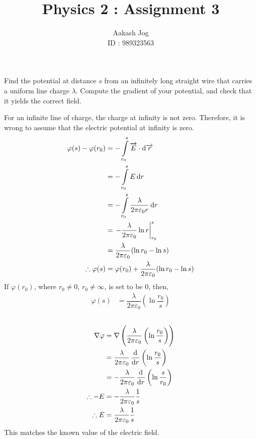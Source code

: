 \documentclass[fleqn, a4paper, 12pt, oneside]{amsart}
\title{Physics 2 : Assignment 3}
\author
{
	Aakash Jog\\
	ID : 989323563
}
\date{\formatdate{15}{4}{2015}}
\theoremstyle{definition}
\theoremstyle{theorem}
\begin{document}
\maketitle

\begin{question}
	Find the potential at distance $s$ from an infinitely long straight wire that carries a uniform line charge $\lambda$.
	Compute the gradient of your potential, and check that it yields the correct field.
\end{question}

\begin{solution}
	For an infinite line of charge, the charge at infinity is not zero.
	Therefore, it is wrong to assume that the electric potential at infinity is zero.
	\begin{align*}
		\varphi(s) - \varphi(r_0) &= -\int\limits_{r_0}^{s} \overrightarrow{E} \cdot \dif \overrightarrow{r}\\
		&= - \int\limits_{r_0}^{s} E \dif r\\
		&= - \int\limits_{r_0}^{s} \dfrac{\lambda}{2 \pi \varepsilon_0 r} \dif r\\
		&= \left. - \dfrac{\lambda}{2 \pi \varepsilon_0} \ln r \right|_{r_0}^{s}\\
		&= \dfrac{\lambda}{2 \pi \varepsilon_0} (\ln r_0 - \ln s)\\
		\therefore \varphi(s) &= \varphi(r_0) + \dfrac{\lambda}{2 \pi \varepsilon_0} (\ln r_0 - \ln s)
	\end{align*}
	If $\varphi(r_0)$, where $r_0 \neq 0$, $r_0 \neq \infty$, is set to be $0$, then,
	\begin{align*}
		\varphi(s) &= \dfrac{\lambda}{2 \pi \varepsilon_0} \left( \ln \dfrac{r_0}{s} \right)
	\end{align*}
	~\\
	\begin{align*}
		\nabla \varphi &= \nabla \left( \dfrac{\lambda}{2 \pi \varepsilon_0} \left( \ln \dfrac{r_0}{s} \right) \right)\\
		&= \dfrac{\lambda}{2 \pi \varepsilon_0} \dod{}{r} \left( \ln \dfrac{r_0}{s} \right)\\
		&= -\dfrac{\lambda}{2 \pi \varepsilon_0} \dod{}{r} \left( \ln \dfrac{s}{r_0} \right)\\
		\therefore -E &= -\dfrac{\lambda}{2 \pi \varepsilon_0} \dfrac{1}{s}\\
		\therefore E &= \dfrac{\lambda}{2 \pi \varepsilon_0} \dfrac{1}{s}
	\end{align*}
	This matches the known value of the electric field.
\end{solution}
\end{document}
